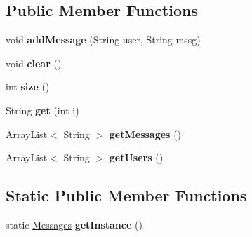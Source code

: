 \subsection*{Public Member Functions}
\begin{DoxyCompactItemize}
\item 
void {\bfseries add\+Message} (String user, String mssg)\hypertarget{classcom_1_1example_1_1sebastian_1_1tindertp_1_1commonTools_1_1Messages_a898127cd6c8e09b91c45433bcd1562a8}{}\label{classcom_1_1example_1_1sebastian_1_1tindertp_1_1commonTools_1_1Messages_a898127cd6c8e09b91c45433bcd1562a8}

\item 
void {\bfseries clear} ()\hypertarget{classcom_1_1example_1_1sebastian_1_1tindertp_1_1commonTools_1_1Messages_ac4991686bf4ac49131d31db5eeec290f}{}\label{classcom_1_1example_1_1sebastian_1_1tindertp_1_1commonTools_1_1Messages_ac4991686bf4ac49131d31db5eeec290f}

\item 
int {\bfseries size} ()\hypertarget{classcom_1_1example_1_1sebastian_1_1tindertp_1_1commonTools_1_1Messages_a1e9bf76356adbf1cd8a9dbcd0098aad8}{}\label{classcom_1_1example_1_1sebastian_1_1tindertp_1_1commonTools_1_1Messages_a1e9bf76356adbf1cd8a9dbcd0098aad8}

\item 
String {\bfseries get} (int i)\hypertarget{classcom_1_1example_1_1sebastian_1_1tindertp_1_1commonTools_1_1Messages_aa84bc91239d7bbd20ee2d945e5d9c985}{}\label{classcom_1_1example_1_1sebastian_1_1tindertp_1_1commonTools_1_1Messages_aa84bc91239d7bbd20ee2d945e5d9c985}

\item 
Array\+List$<$ String $>$ {\bfseries get\+Messages} ()\hypertarget{classcom_1_1example_1_1sebastian_1_1tindertp_1_1commonTools_1_1Messages_ad9cc8e47ab0ea87a1bac7b50efb441ba}{}\label{classcom_1_1example_1_1sebastian_1_1tindertp_1_1commonTools_1_1Messages_ad9cc8e47ab0ea87a1bac7b50efb441ba}

\item 
Array\+List$<$ String $>$ {\bfseries get\+Users} ()\hypertarget{classcom_1_1example_1_1sebastian_1_1tindertp_1_1commonTools_1_1Messages_afdef94457a50751a6488e3287c8ed7f4}{}\label{classcom_1_1example_1_1sebastian_1_1tindertp_1_1commonTools_1_1Messages_afdef94457a50751a6488e3287c8ed7f4}

\end{DoxyCompactItemize}
\subsection*{Static Public Member Functions}
\begin{DoxyCompactItemize}
\item 
static \hyperlink{classcom_1_1example_1_1sebastian_1_1tindertp_1_1commonTools_1_1Messages}{Messages} {\bfseries get\+Instance} ()\hypertarget{classcom_1_1example_1_1sebastian_1_1tindertp_1_1commonTools_1_1Messages_adfa44cdb9f730f5bc7f708a730fb4fbc}{}\label{classcom_1_1example_1_1sebastian_1_1tindertp_1_1commonTools_1_1Messages_adfa44cdb9f730f5bc7f708a730fb4fbc}

\end{DoxyCompactItemize}
